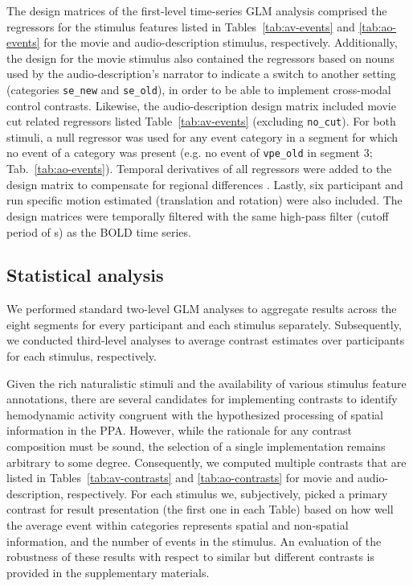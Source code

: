 \documentclass[english]{article}
\begin{document}
The design matrices of the first-level time-series GLM analysis comprised the
regressors for the stimulus features listed in Tables~\ref{tab:av-events} and
\ref{tab:ao-events} for the movie and audio-description stimulus, respectively.
Additionally, the design for the movie stimulus also contained the
regressors based on nouns used by the audio-description's narrator to indicate
a switch to another setting (categories \texttt{se\_new} and \texttt{se\_old}),
in order to be able to implement cross-modal control contrasts.
Likewise, the audio-description design matrix included movie cut related regressors
listed Table~\ref{tab:av-events} (excluding \texttt{no\_cut}).
For both stimuli, a null regressor was used for any event category in a segment
for which no event of a category was present (e.g. no event of
\texttt{vpe\_old} in segment 3; Tab.~\ref{tab:ao-events}).
Temporal derivatives of all regressors were added to the design matrix to compensate for
regional differences \citep{friston1998event}.
Lastly, six participant and run specific motion estimated (translation and rotation)
were also included.
The design matrices were temporally filtered with the same high-pass filter (cutoff period of
\unit[150]{s}) as the BOLD time series.


\subsection{Statistical analysis}

We performed standard two-level GLM analyses to aggregate results across the eight
segments for every participant and each stimulus separately.
Subsequently, we conducted third-level analyses to average contrast estimates
over participants for each stimulus, respectively.

Given the rich naturalistic stimuli and the availability of various stimulus
feature annotations, there are several candidates for implementing contrasts to
identify hemodynamic activity congruent with the hypothesized processing of
spatial information in the PPA. However, while the rationale for any contrast
composition must be sound, the selection of a single implementation remains
arbitrary to some degree. Consequently, we computed multiple contrasts that are
listed in Tables~\ref{tab:av-contrasts} and \ref{tab:ao-contrasts} for movie
and audio-description, respectively. For each stimulus we, subjectively, picked
a primary contrast for result presentation (the first one in each Table) based
on how well the average event within categories represents spatial and
non-spatial information, and the number of events in the stimulus.
An evaluation of the robustness of these results with respect to similar but
different contrasts is provided in the supplementary materials.
\end{document}
